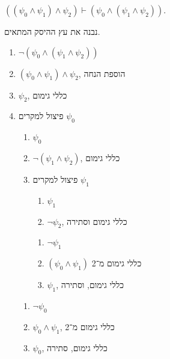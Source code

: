 \subquestion{}
$((\psi_0 \land \psi_1) \land \psi_2) \vdash (\psi_0 \land (\psi_1 \land \psi_2))$.
\begin{solution}
	נבנה את עץ ההיסק המתאים.
	\begin{enumerate}
		\item $\lnot (\psi_0 \land (\psi_1 \land \psi_2))$
		\item $(\psi_0 \land \psi_1) \land \psi_2$, הוספת הנחה
		\item $\psi_2$, כללי גימום
		\item פיצול למקרים $\psi_0$
			\begin{enumerate}
				\item $\psi_0$
				\item $\lnot (\psi_1 \land \psi_2)$, כללי גימום
				\item פיצול למקרים $\psi_1$
					\begin{enumerate}
						\item $\psi_1$
						\item $\lnot \psi_2$, כללי גימום וסתירה
					\end{enumerate}
					\begin{enumerate}
						\item $\lnot \psi_1$
						\item $(\psi_0 \land \psi_1)$ כללי גימום מ־2
						\item $\psi_1$, כללי גימום, וסתירה
					\end{enumerate}
			\end{enumerate}
			\begin{enumerate}
				\item $\lnot \psi_0$
				\item $\psi_0 \land \psi_1$, כללי גימום מ־2
				\item $\psi_0$, כללי גימום, סתירה
			\end{enumerate}
	\end{enumerate}
\end{solution}

